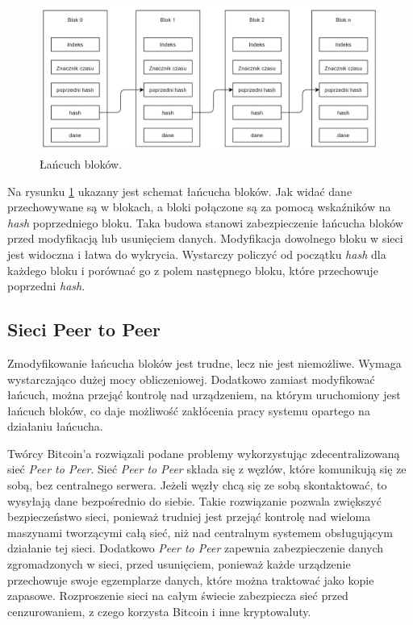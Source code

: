 \documentclass[a4paper,12pt]{book}
\begin{document}
\begin{figure}[h]
	\centering
	\includegraphics[width=\textwidth]{images/łańcuch_bloków.jpg}
	\caption {Łańcuch bloków.}\label{blocksschain}
\end {figure}

Na rysunku \ref{blocksschain} ukazany jest schemat łańcucha bloków. Jak widać dane przechowywane są w blokach, a bloki połączone są za pomocą wskaźników na \textit{hash} poprzedniego bloku. Taka budowa stanowi zabezpieczenie łańcucha bloków przed modyfikacją lub usunięciem danych. Modyfikacja dowolnego bloku w sieci jest widoczna i łatwa do wykrycia. Wystarczy policzyć od początku \textit{hash} dla każdego bloku i porównać go z polem następnego bloku, które przechowuje poprzedni \textit{hash}.

\subsection{Sieci Peer to Peer}

Zmodyfikowanie łańcucha bloków jest trudne, lecz nie jest niemożliwe. Wymaga wystarczająco dużej mocy obliczeniowej. Dodatkowo zamiast modyfikować łańcuch, można przejąć kontrolę nad urządzeniem, na którym uruchomiony jest łańcuch bloków, co daje możliwość zakłócenia pracy systemu opartego na działaniu łańcucha.

Twórcy Bitcoin'a rozwiązali podane problemy wykorzystując zdecentralizowaną sieć \textit{Peer to Peer}. Sieć \textit{Peer to Peer} składa się z węzłów, które komunikują się ze sobą, bez centralnego serwera. Jeżeli węzły chcą się ze sobą skontaktować, to wysyłają dane bezpośrednio do siebie. Takie rozwiązanie pozwala zwiększyć bezpieczeństwo sieci, ponieważ trudniej jest przejąć kontrolę nad wieloma maszynami tworzącymi całą sieć, niż nad centralnym systemem obsługującym działanie tej sieci. Dodatkowo \textit{Peer to Peer} zapewnia zabezpieczenie danych zgromadzonych w sieci, przed usunięciem, ponieważ każde urządzenie przechowuje swoje egzemplarze danych, które można traktować jako kopie zapasowe. 
Rozproszenie sieci na całym świecie zabezpiecza sieć przed cenzurowaniem, z czego korzysta Bitcoin i inne kryptowaluty.
\end{document}
